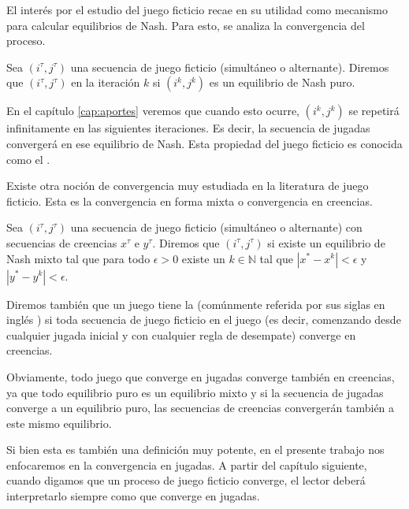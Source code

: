 El interés por el estudio del juego ficticio recae en su utilidad como mecanismo para calcular equilibrios de Nash. Para esto, se analiza la convergencia del proceso.

\begin{definition}

    Sea $(i^\tau, j^\tau)$ una secuencia de juego ficticio (simultáneo o alternante). Diremos que $(i^\tau, j^\tau)$  en la iteración $k$ si $(i^k, j^k)$ es un equilibrio de Nash puro.

\end{definition}

En el capítulo \ref{cap:aportes} veremos que cuando esto ocurre, $(i^k, j^k)$ se repetirá infinitamente en las siguientes iteraciones. Es decir, la secuencia de jugadas convergerá en ese equilibrio de Nash. Esta propiedad del juego ficticio es conocida como el .


Existe otra noción de convergencia muy estudiada en la literatura de juego ficticio. Esta es la convergencia en forma mixta o convergencia en creencias.

\begin{definition}
    Sea $(i^\tau, j^\tau)$ una secuencia de juego ficticio (simultáneo o alternante) con secuencias de creencias $x^\tau$ e $y^\tau$. Diremos que $(i^\tau, j^\tau)$  si existe un equilibrio de Nash mixto tal que para todo $\epsilon > 0$ existe un $k \in \mathbb{N}$ tal que $|x^* - x^k| < \epsilon$ y $|y^* - y^k| < \epsilon$.
\end{definition}

Diremos también que un juego tiene la  (comúnmente referida por sus siglas en inglés ) si toda secuencia de juego ficticio en el juego (es decir, comenzando desde cualquier jugada inicial y con cualquier regla de desempate) converge en creencias.

Obviamente, todo juego que converge en jugadas converge también en creencias, ya que todo equilibrio puro es un equilibrio mixto y si la secuencia de jugadas converge a un equilibrio puro, las secuencias de creencias convergerán también a este mismo equilibrio.

Si bien esta es también una definición muy potente, en el presente trabajo nos enfocaremos en la convergencia en jugadas. A partir del capítulo siguiente, cuando digamos que un proceso de juego ficticio converge, el lector deberá interpretarlo siempre como que converge en jugadas.


